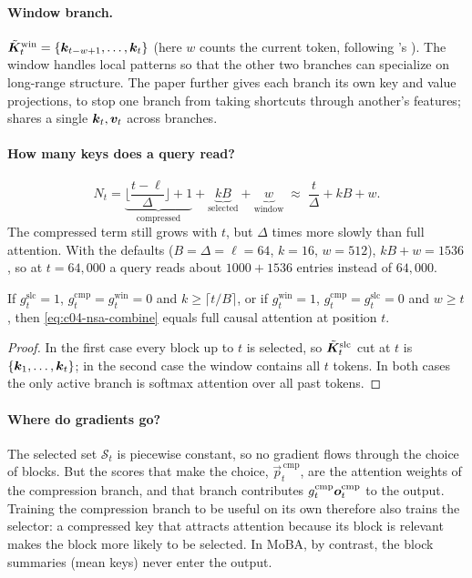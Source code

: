 \paragraph{Window branch.}
$\tilde{\bm{K}}^{\mathrm{win}}_t=\{\bm{k}_{t-w+1},\dots,\bm{k}_t\}$ (here $w$ counts the current token,
following \fla's ). The window handles local patterns so that the other two
branches can specialize on long-range structure. The paper further gives each branch its own key
and value projections, to stop one branch from taking shortcuts through another's features;
\fla{} shares a single $\bm{k}_t,\bm{v}_t$ across branches.

\paragraph{How many keys does a query read?}
\begin{equation}\label{eq:c04-nsa-count}
  N_t=\underbrace{\Big\lfloor\frac{t-\ell}{\Delta}\Big\rfloor+1}_{\text{compressed}}
  +\underbrace{kB}_{\text{selected}}+\underbrace{w}_{\text{window}}
  \;\approx\;\frac{t}{\Delta}+kB+w .
\end{equation}
The compressed term still grows with $t$, but $\Delta$ times more slowly than full attention.
With the \fla{} defaults ($B=\Delta=\ell=64$, $k=16$, $w=512$), $kB+w=1536$, so at $t=64{,}000$
a query reads about $1000+1536$ entries instead of $64{,}000$.

\begin{proposition}\label{prop:c04-nsa-special}
If $g^{\mathrm{slc}}_t=1$, $g^{\mathrm{cmp}}_t=g^{\mathrm{win}}_t=0$ and $k\ge\lceil t/B\rceil$,
or if $g^{\mathrm{win}}_t=1$, $g^{\mathrm{cmp}}_t=g^{\mathrm{slc}}_t=0$ and $w\ge t$, then
\eqref{eq:c04-nsa-combine} equals full causal attention at position $t$.
\end{proposition}
\begin{proof}
In the first case every block up to $t$ is selected, so $\tilde{\bm{K}}^{\mathrm{slc}}_t$ cut at $t$
is $\{\bm{k}_1,\dots,\bm{k}_t\}$; in the second case the window contains all $t$ tokens. In both cases
the only active branch is softmax attention over all past tokens.
\end{proof}

\paragraph{Where do gradients go?}
The selected set $\mathcal{S}_t$ is piecewise constant, so no gradient flows through the choice
of blocks. But the scores that make the choice, $\vec{p}^{\,\mathrm{cmp}}_t$, are the attention
weights of the compression branch, and that branch contributes $g^{\mathrm{cmp}}_t\bm{o}^{\mathrm{cmp}}_t$
to the output. Training the compression branch to be useful on its own therefore also trains the
selector: a compressed key that attracts attention because its block is relevant makes the block
more likely to be selected. In MoBA, by contrast, the block summaries (mean keys) never enter the
output.

